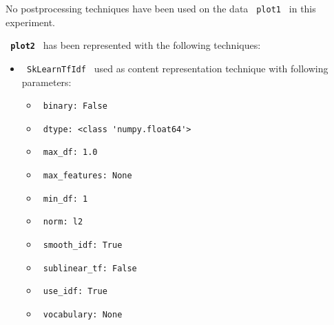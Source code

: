 \documentclass[11pt]{article}
\begin{document}
No postprocessing techniques have been used on the data \lstinline[style=verbatim-text]| plot1 | in this experiment.
\hfill\break
\hfill\break



\textbf{\lstinline[style=verbatim-text]| plot2 |} has been represented with the following techniques:
\hfill\break
\hfill\break

\begin{itemize}
                                                            
            \item
        \verb| SkLearnTfIdf | used as content representation technique with following parameters:
        \begin{itemize}
                            \item
                \verb| binary: False|
                            \item
                \verb| dtype: <class 'numpy.float64'>|
                            \item
                \verb| max_df: 1.0|
                            \item
                \verb| max_features: None|
                            \item
                \verb| min_df: 1|
                            \item
                \verb| norm: l2|
                            \item
                \verb| smooth_idf: True|
                            \item
                \verb| sublinear_tf: False|
                            \item
                \verb| use_idf: True|
                            \item
                \verb| vocabulary: None|
                    \end{itemize}
    \end{itemize}
\hfill\break
\hfill\break
\end{document}
